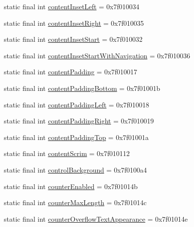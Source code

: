 \begin{CompactItemize}
static final int \hyperlink{classandroid_1_1support_1_1v4_1_1_r_1_1attr_f9b033fa8f4c522a96539cb694057069}{contentInsetLeft} = 0x7f010034
\item 
static final int \hyperlink{classandroid_1_1support_1_1v4_1_1_r_1_1attr_3b8cccc0efcc6274b878754350944b7b}{contentInsetRight} = 0x7f010035
\item 
static final int \hyperlink{classandroid_1_1support_1_1v4_1_1_r_1_1attr_18495c38d73263680f4b755ec47bd0de}{contentInsetStart} = 0x7f010032
\item 
static final int \hyperlink{classandroid_1_1support_1_1v4_1_1_r_1_1attr_7ab1cf43bc973cbff6a041f46654828d}{contentInsetStartWithNavigation} = 0x7f010036
\item 
static final int \hyperlink{classandroid_1_1support_1_1v4_1_1_r_1_1attr_0386ad84d0049c7f7e8fcbc4a46486ef}{contentPadding} = 0x7f010017
\item 
static final int \hyperlink{classandroid_1_1support_1_1v4_1_1_r_1_1attr_92d2c588fa7865789b27b48d88ab8e41}{contentPaddingBottom} = 0x7f01001b
\item 
static final int \hyperlink{classandroid_1_1support_1_1v4_1_1_r_1_1attr_6cf1c4f10e5e16f428e3e7e74b7709d2}{contentPaddingLeft} = 0x7f010018
\item 
static final int \hyperlink{classandroid_1_1support_1_1v4_1_1_r_1_1attr_e2b10f1fb72497b73461606384d25f86}{contentPaddingRight} = 0x7f010019
\item 
static final int \hyperlink{classandroid_1_1support_1_1v4_1_1_r_1_1attr_901ecbaac834e8d01ec8950a1dd259a8}{contentPaddingTop} = 0x7f01001a
\item 
static final int \hyperlink{classandroid_1_1support_1_1v4_1_1_r_1_1attr_4f33fc74e7bafcc4747d8850bb962677}{contentScrim} = 0x7f010112
\item 
static final int \hyperlink{classandroid_1_1support_1_1v4_1_1_r_1_1attr_9a051c3a68419454c2cfa24a8eb38939}{controlBackground} = 0x7f0100a4
\item 
static final int \hyperlink{classandroid_1_1support_1_1v4_1_1_r_1_1attr_cfbf4bb19df110c7c8f77f68174b0528}{counterEnabled} = 0x7f01014b
\item 
static final int \hyperlink{classandroid_1_1support_1_1v4_1_1_r_1_1attr_ff77590d5bddcd0f541d103db1718747}{counterMaxLength} = 0x7f01014c
\item 
static final int \hyperlink{classandroid_1_1support_1_1v4_1_1_r_1_1attr_14bd3fd4d1f6a0d2cb081c1976a24eb6}{counterOverflowTextAppearance} = 0x7f01014e
\item 

\end{CompactItemize}
